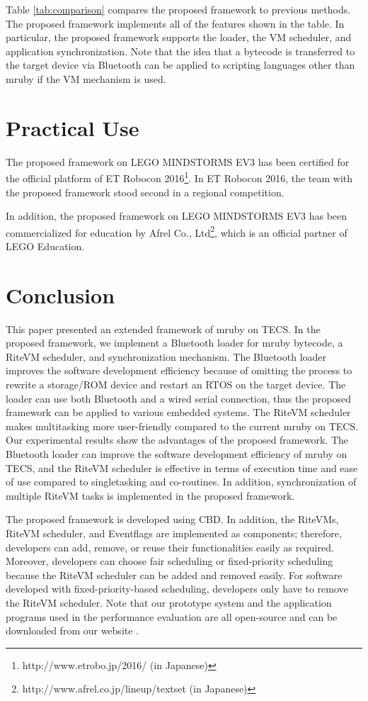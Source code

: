 \documentclass[S,R,E]{article/compsoft}
\begin{document}
{Table \ref{tab:comparison} compares the proposed framework to previous methods.
The proposed framework implements all of the features shown in the table.
In particular, the proposed framework supports the loader, the VM scheduler, and application synchronization.
Note that the idea that a bytecode is transferred to the target device via Bluetooth can be applied to scripting languages other than mruby if the VM mechanism is used.
 
\section{Practical Use}
\label{sec:Results}
The proposed framework on LEGO MINDSTORMS EV3 \cite{url:download} has been certified for the official platform of ET Robocon 2016\footnote{http://www.etrobo.jp/2016/ (in Japanese)}.
In ET Robocon 2016, the team with the proposed framework stood second in a regional competition.

In addition, the proposed framework on LEGO MINDSTORMS EV3 has been commercialized for education by Afrel Co., Ltd\footnote{http://www.afrel.co.jp/lineup/textset (in Japanese)}, which is an official partner of LEGO Education.

\section{Conclusion}
\label{sec:Conclusion}
This paper presented an extended framework of mruby on TECS.
In the proposed framework, we implement a Bluetooth loader for mruby bytecode, a RiteVM scheduler, and synchronization mechanism.
The Bluetooth loader improves the software development efficiency because of omitting the process to rewrite a storage/ROM device and restart an RTOS on the target device.
The loader can use both Bluetooth and a wired serial connection, thus the proposed framework can be applied to various embedded systems.
The RiteVM scheduler makes multitasking more user-friendly compared to the current mruby on TECS.
Our experimental results show the advantages of the proposed framework.
The Bluetooth loader can improve the software development efficiency of mruby on TECS, and the RiteVM scheduler is effective in terms of execution time and ease of use compared to singletasking and co-routines.
In addition, synchronization of multiple RiteVM tasks is implemented in the proposed framework.

The proposed framework is developed using CBD.
In addition, the RiteVMs, RiteVM scheduler, and Eventflags are implemented as components; therefore, developers can add, remove, or reuse their functionalities easily as required.
Moreover, developers can choose fair scheduling or fixed-priority scheduling because the RiteVM scheduler can be added and removed easily.
For software developed with fixed-priority-based scheduling, developers only have to remove the RiteVM scheduler.
Note that our prototype system and the application programs used in the performance evaluation are all open-source and can be downloaded from our website \cite{url:download}.

}
\end{document}

